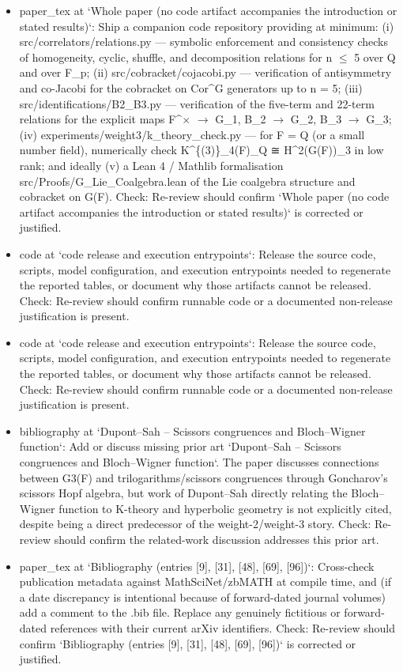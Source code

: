 \documentclass[11pt]{article}
\begin{document}
\begin{itemize}[leftmargin=*]
  \item [open] paper\_tex at `Whole paper (no code artifact accompanies the introduction or stated results)`: Ship a companion code repository providing at minimum: (i) src/correlators/relations.py --- symbolic enforcement and consistency checks of homogeneity, cyclic, shuffle, and decomposition relations for n \ensuremath{\le} 5 over Q and over F\_p; (ii) src/cobracket/cojacobi.py --- verification of antisymmetry and co-Jacobi for the cobracket on Cor\^{}G generators up to n = 5; (iii) src/identifications/B2\_B3.py --- verification of the five-term and 22-term relations for the explicit maps F\^{}\ensuremath{\times} \ensuremath{\to} G\_1, B\_2 \ensuremath{\to} G\_2, B\_3 \ensuremath{\to} G\_3; (iv) experiments/weight3/k\_theory\_check.py --- for F = Q (or a small number field), numerically check K\^{}\{(3)\}\_4(F)\_Q ≅ H\^{}2(G(F))\_3 in low rank; and ideally (v) a Lean 4 / Mathlib formalisation src/Proofs/G\_Lie\_Coalgebra.lean of the Lie coalgebra structure and cobracket on G(F). Check: Re-review should confirm `Whole paper (no code artifact accompanies the introduction or stated results)` is corrected or justified.
  \item [open] code at `code release and execution entrypoints`: Release the source code, scripts, model configuration, and execution entrypoints needed to regenerate the reported tables, or document why those artifacts cannot be released. Check: Re-review should confirm runnable code or a documented non-release justification is present.
  \item [open] code at `code release and execution entrypoints`: Release the source code, scripts, model configuration, and execution entrypoints needed to regenerate the reported tables, or document why those artifacts cannot be released. Check: Re-review should confirm runnable code or a documented non-release justification is present.
  \item [open] bibliography at `Dupont--Sah -- Scissors congruences and Bloch--Wigner function`: Add or discuss missing prior art `Dupont--Sah -- Scissors congruences and Bloch--Wigner function`. The paper discusses connections between G3(F) and trilogarithms/scissors congruences through Goncharov's scissors Hopf algebra, but work of Dupont--Sah directly relating the Bloch--Wigner function to K-theory and hyperbolic geometry is not explicitly cited, despite being a direct predecessor of the weight-2/weight-3 story. Check: Re-review should confirm the related-work discussion addresses this prior art.
  \item [open] paper\_tex at `Bibliography (entries [9], [31], [48], [69], [96])`: Cross-check publication metadata against MathSciNet/zbMATH at compile time, and (if a date discrepancy is intentional because of forward-dated journal volumes) add a comment to the .bib file. Replace any genuinely fictitious or forward-dated references with their current arXiv identifiers. Check: Re-review should confirm `Bibliography (entries [9], [31], [48], [69], [96])` is corrected or justified.
\end{itemize}
\end{document}
